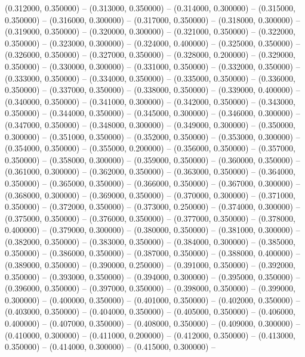 (0.312000, 0.350000) -- 
(0.313000, 0.350000) -- 
(0.314000, 0.300000) -- 
(0.315000, 0.350000) -- 
(0.316000, 0.300000) -- 
(0.317000, 0.350000) -- 
(0.318000, 0.300000) -- 
(0.319000, 0.350000) -- 
(0.320000, 0.300000) -- 
(0.321000, 0.350000) -- 
(0.322000, 0.350000) -- 
(0.323000, 0.300000) -- 
(0.324000, 0.400000) -- 
(0.325000, 0.350000) -- 
(0.326000, 0.350000) -- 
(0.327000, 0.350000) -- 
(0.328000, 0.200000) -- 
(0.329000, 0.350000) -- 
(0.330000, 0.300000) -- 
(0.331000, 0.350000) -- 
(0.332000, 0.350000) -- 
(0.333000, 0.350000) -- 
(0.334000, 0.350000) -- 
(0.335000, 0.350000) -- 
(0.336000, 0.350000) -- 
(0.337000, 0.350000) -- 
(0.338000, 0.350000) -- 
(0.339000, 0.400000) -- 
(0.340000, 0.350000) -- 
(0.341000, 0.300000) -- 
(0.342000, 0.350000) -- 
(0.343000, 0.350000) -- 
(0.344000, 0.350000) -- 
(0.345000, 0.300000) -- 
(0.346000, 0.300000) -- 
(0.347000, 0.350000) -- 
(0.348000, 0.300000) -- 
(0.349000, 0.300000) -- 
(0.350000, 0.300000) -- 
(0.351000, 0.350000) -- 
(0.352000, 0.350000) -- 
(0.353000, 0.300000) -- 
(0.354000, 0.350000) -- 
(0.355000, 0.200000) -- 
(0.356000, 0.350000) -- 
(0.357000, 0.350000) -- 
(0.358000, 0.300000) -- 
(0.359000, 0.350000) -- 
(0.360000, 0.350000) -- 
(0.361000, 0.300000) -- 
(0.362000, 0.350000) -- 
(0.363000, 0.350000) -- 
(0.364000, 0.350000) -- 
(0.365000, 0.350000) -- 
(0.366000, 0.350000) -- 
(0.367000, 0.300000) -- 
(0.368000, 0.300000) -- 
(0.369000, 0.350000) -- 
(0.370000, 0.300000) -- 
(0.371000, 0.350000) -- 
(0.372000, 0.350000) -- 
(0.373000, 0.250000) -- 
(0.374000, 0.300000) -- 
(0.375000, 0.350000) -- 
(0.376000, 0.350000) -- 
(0.377000, 0.350000) -- 
(0.378000, 0.400000) -- 
(0.379000, 0.300000) -- 
(0.380000, 0.350000) -- 
(0.381000, 0.300000) -- 
(0.382000, 0.350000) -- 
(0.383000, 0.350000) -- 
(0.384000, 0.300000) -- 
(0.385000, 0.350000) -- 
(0.386000, 0.350000) -- 
(0.387000, 0.350000) -- 
(0.388000, 0.400000) -- 
(0.389000, 0.350000) -- 
(0.390000, 0.250000) -- 
(0.391000, 0.350000) -- 
(0.392000, 0.350000) -- 
(0.393000, 0.350000) -- 
(0.394000, 0.300000) -- 
(0.395000, 0.350000) -- 
(0.396000, 0.350000) -- 
(0.397000, 0.350000) -- 
(0.398000, 0.350000) -- 
(0.399000, 0.300000) -- 
(0.400000, 0.350000) -- 
(0.401000, 0.350000) -- 
(0.402000, 0.350000) -- 
(0.403000, 0.350000) -- 
(0.404000, 0.350000) -- 
(0.405000, 0.350000) -- 
(0.406000, 0.400000) -- 
(0.407000, 0.350000) -- 
(0.408000, 0.350000) -- 
(0.409000, 0.300000) -- 
(0.410000, 0.300000) -- 
(0.411000, 0.200000) -- 
(0.412000, 0.350000) -- 
(0.413000, 0.350000) -- 
(0.414000, 0.300000) -- 
(0.415000, 0.300000) -- 
